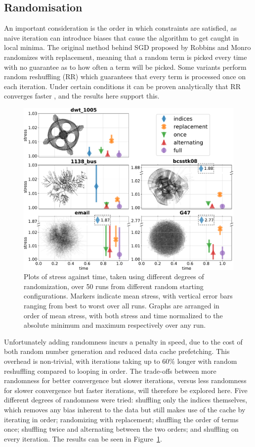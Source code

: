 \subsection{Randomisation}
\label{sec:randomisation}
An important consideration is the order in which constraints are satisfied, as naive iteration can introduce biases that cause the algorithm to get caught in local minima.
The original method behind SGD proposed by Robbins and Monro \cite{Robbins1951} randomizes with replacement, meaning that a random term is picked every time with no guarantee as to how often a term will be picked. Some variants perform random reshuffling (RR) which guarantees that every term is processed once on each iteration. Under certain conditions it can be proven analytically that RR converges faster \cite{Gurbuzbalaban2019}, and the results here support this.

\begin{figure}
  \centering
  \includegraphics[width=.9\textwidth]{stress/random.pdf}
  \caption[A comparison of methods for term order randomisation]{Plots of stress against time, taken using different degrees of randomization, over 50 runs from different random starting configurations. Markers indicate mean stress, with vertical error bars ranging from best to worst over all runs.
  Graphs are arranged in order of mean stress, with both stress and time normalized to the absolute minimum and maximum respectively over any run.
  }
  \label{fig:randomisation}
\end{figure}

Unfortunately adding randomness incurs a penalty in speed, due to the cost of both random number generation and reduced data cache prefetching.
This overhead is non-trivial, with iterations taking up to 60\% longer with random reshuffling compared to looping in order. 
The trade-offs between more randomness for better convergence but slower iterations, versus less randomness for slower convergence but faster iterations, will therefore be explored here.
Five different degrees of randomness were tried: shuffling only the indices themselves, which removes any bias inherent to the data but still makes use of the cache by iterating in order; randomizing with replacement; shuffling the order of terms once; shuffling twice and alternating between the two orders; and shuffling on every iteration.
The results can be seen in Figure~\ref{fig:randomisation}.

